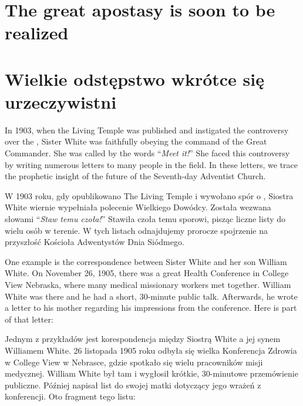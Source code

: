 \chapter{The great apostasy is soon to be realized} \label{chap:apostasy}


\chapter{Wielkie odstępstwo wkrótce się urzeczywistni} \label{chap:apostasy}


In 1903, when the Living Temple was published and instigated the controversy over the , Sister White was faithfully obeying the command of the Great Commander. She was called by the words “\textit{Meet it!}” She faced this controversy by writing numerous letters to many people in the field. In these letters, we trace the prophetic insight of the future of the Seventh-day Adventist Church.


W 1903 roku, gdy opublikowano The Living Temple i wywołano spór o , Siostra White wiernie wypełniała polecenie Wielkiego Dowódcy. Została wezwana słowami “\textit{Staw temu czoła!}” Stawiła czoła temu sporowi, pisząc liczne listy do wielu osób w terenie. W tych listach odnajdujemy prorocze spojrzenie na przyszłość Kościoła Adwentystów Dnia Siódmego.


One example is the correspondence between Sister White and her son William White. On November 26, 1905, there was a great Health Conference in College View Nebraska, where many medical missionary workers met together. William White was there and he had a short, 30-minute public talk. Afterwards, he wrote a letter to his mother regarding his impressions from the conference. Here is part of that letter:


Jednym z przykładów jest korespondencja między Siostrą White a jej synem Williamem White. 26 listopada 1905 roku odbyła się wielka Konferencja Zdrowia w College View w Nebrasce, gdzie spotkało się wielu pracowników misji medycznej. William White był tam i wygłosił krótkie, 30-minutowe przemówienie publiczne. Później napisał list do swojej matki dotyczący jego wrażeń z konferencji. Oto fragment tego listu:


 \\
 \\


